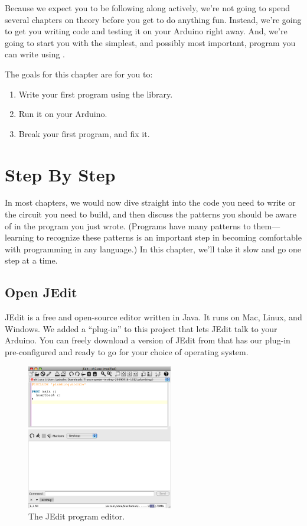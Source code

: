 
Because we expect you to be following along actively, we're not going to spend several chapters on theory before you get to do anything fun. Instead, we're going to get you writing code and testing it on your Arduino right away. And, we're going to start you with the simplest, and possibly most important, program you can write using \plumbing.

\GOALS
The goals for this chapter are for you to:

\begin{enumerate}
	\item Write your first program using the \plumbing library.
	\item Run it on your Arduino.
	\item Break your first program, and fix it.
\end{enumerate}


\section{Step By Step}
In most chapters, we would now dive straight into the code you need to write or the circuit you need to build, and then discuss the patterns you should be aware of in the program you just wrote. (Programs have many patterns to them---learning to recognize these patterns is an important step in becoming comfortable with programming in any language.) In this chapter, we'll take it slow and go one step at a time.
          
\subsection{Open JEdit}
JEdit is a free and open-source editor written in Java. It runs on Mac, Linux, and Windows. We added a ``plug-in'' to this project that lets JEdit talk to your Arduino. You can freely download a version of JEdit from \ccc that has our plug-in pre-configured and ready to go for your choice of operating system.
      
\begin{figure}[bph]
  \begin{center}
    \includegraphics[height=2.5in]{screenshots/20091207-jedit-docked-occplug}
    \caption{The JEdit program editor.}
    \label{screenshot:jedit-occplug-docked}
  \end{center}
\end{figure}

